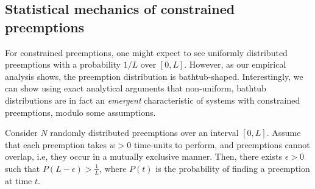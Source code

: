 
% 



\subsection{Statistical mechanics of constrained preemptions}
\label{subsec:stat-mech}

For constrained preemptions, one might expect to see uniformly distributed preemptions with a probability $1/L$ over $[0, L]$. 
However, as our empirical analysis shows, the preemption distribution is bathtub-shaped.
Interestingly, we can show using exact analytical arguments that non-uniform, bathtub distributions are in fact an \emph{emergent} characteristic of systems with constrained preemptions, modulo some assumptions. 

\begin{lemma}\label{lemma:1}
  Consider $N$ randomly distributed preemptions over an interval $[0, L]$.
  Assume that each preemption takes $w > 0$ time-units to perform, and preemptions cannot overlap, i.e, they occur in a mutually exclusive manner.
  Then, there exists $\epsilon > 0$ such that  $P(L-\epsilon) > \frac{1}{L}$, where 
 $P(t)$ is the probability of finding a preemption at time $t$. 
\end{lemma}


